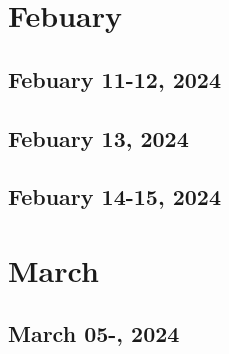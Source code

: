 \chapter{Febuary}
\section{Febuary 11-12, 2024}

\section{Febuary 13, 2024}

\section{Febuary 14-15, 2024}


\chapter{March}
\section{March 05-, 2024}
